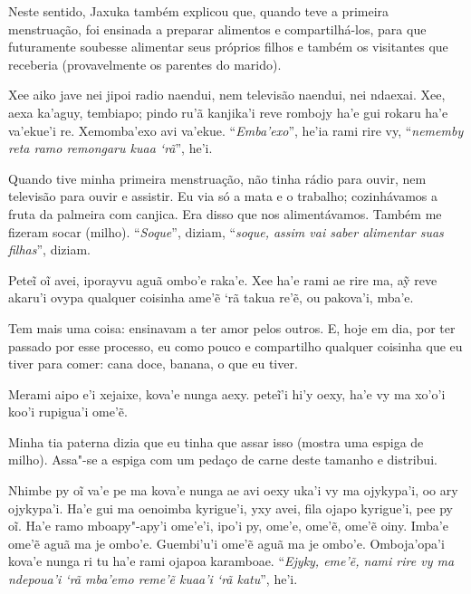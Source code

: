 \indent
Neste sentido, Jaxuka também explicou que, quando teve a primeira
menstruação, foi ensinada a preparar alimentos e compartilhá-los, para
que futuramente soubesse alimentar seus próprios filhos e também os
visitantes que receberia (provavelmente os parentes do marido).

\bigskip

\begin{paracol}{2}
\footnotesize
\vspace*{0.4cm}

\noindent
Xee aiko jave nei jipoi radio naendui, nem televisão naendui, nei
ndaexai. Xee, aexa ka'aguy, tembiapo; pindo ru'ã kanjika'i reve rombojy
ha'e gui rokaru ha'e va'ekue'i re. Xemomba'exo avi va'ekue.
``\emph{Emba'exo}'', he'ia rami rire vy, ``\emph{nememby reta ramo
remongaru kuaa `rã}'', he'i.  

\bigskip

\switchcolumn
\noindent
Quando tive minha primeira menstruação, não tinha rádio para ouvir, nem
televisão para ouvir e assistir. Eu via só a mata e o trabalho;
cozinhávamos a fruta da palmeira com canjica. Era disso que nos
alimentávamos. Também me fizeram socar (milho). ``\emph{Soque}'',
diziam, ``\emph{soque, assim vai saber alimentar suas filhas}'', diziam.

\smallskip

\switchcolumn
\medskip
\noindent
Peteĩ oĩ avei, iporayvu aguã ombo'e raka'e. Xee ha'e rami ae rire ma, aỹ
reve akaru'i ovypa qualquer coisinha ame'ẽ `rã takua re'ẽ, ou pakova'i,
mba'e.

\bigskip

\switchcolumn
\noindent
Tem mais uma coisa: ensinavam a ter amor pelos outros. E, hoje em dia,
por ter passado por esse processo, eu como pouco e compartilho qualquer
coisinha que eu tiver para comer: cana doce, banana, o que eu tiver. 

\smallskip

\switchcolumn
\medskip
\noindent
Merami aipo e'i xejaixe, kova'e nunga aexy. peteĩ'i hi'y oexy, ha'e vy
ma xo'o'i koo'i rupigua'i ome'ẽ.

\bigskip

\switchcolumn
\noindent
Minha tia paterna dizia que eu tinha que assar isso (mostra uma espiga
de milho). Assa"-se a espiga com um pedaço de carne deste tamanho e
distribui.

\smallskip

\switchcolumn
\medskip
\noindent
Nhimbe py oĩ va'e pe ma kova'e nunga ae avi oexy uka'i vy ma ojykypa'i,
oo ary ojykypa'i. Ha'e gui ma oenoimba kyrigue'i, yxy avei, fila ojapo
kyrigue'i, pee py oĩ. Ha'e ramo mboapy"-apy'i ome'e'i, ipo'i py, ome'e,
ome'ẽ, ome'ẽ oiny. Imba'e ome'ẽ aguã ma je ombo'e. Guembi'u'i ome'ẽ aguã
ma je ombo'e. Omboja'opa'i kova'e nunga ri tu ha'e rami ojapoa
karamboae. ``\emph{Ejyky, eme'ẽ, nami rire vy ma ndepoua'i `rã mba'emo
reme'ẽ kuaa'i `rã katu}'', he'i.


\end{paracol}
